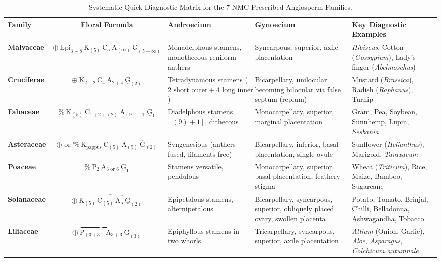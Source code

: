 \documentclass[10pt,twoside,openright]{book}
\begin{document}
\begin{landscape}
\begin{table}[p]
\centering
\small
\setlength{\tabcolsep}{4pt}
\renewcommand{\arraystretch}{1.2}
\begin{tabularx}{\linewidth}{l c p{3.2cm} p{3.2cm} X}
\toprule
\textbf{Family} & \textbf{Floral Formula} & \textbf{Androecium} & \textbf{Gynoecium} & \textbf{Key Diagnostic Examples} \\
\midrule
\textbf{Malvaceae} & $\oplus\:\text{Epi}_{3-8}\:\text{K}_{(5)}\:\text{C}_5\:\text{A}_{(\infty)}\:\underline{\text{G}}_{(5-\infty)}$ & Monadelphous stamens, monothecous reniform anthers & Syncarpous, superior, axile placentation & \textit{Hibiscus}, Cotton (\textit{Gossypium}), Lady's finger (\textit{Abelmoschus}) \\
\textbf{Cruciferae} & $\oplus\:\text{K}_{2+2}\:\text{C}_{4}\:\text{A}_{2+4}\:\underline{\text{G}}_{(2)}$ & Tetradynamous stamens ($2\text{ short outer} + 4\text{ long inner}$) & Bicarpellary, unilocular becoming bilocular via false septum (replum) & Mustard (\textit{Brassica}), Radish (\textit{Raphanus}), Turnip \\
\textbf{Fabaceae} & $\% \:\text{K}_{(5)}\:\text{C}_{1+2+(2)}\:\text{A}_{(9)+1}\:\underline{\text{G}}_1$ & Diadelphous stamens $[(9)+1]$, dithecous & Monocarpellary, superior, marginal placentation & Gram, Pea, Soybean, Sunnhemp, Lupin, \textit{Sesbania} \\
\textbf{Asteraceae} & $\oplus \text{ or } \%\:\text{K}_{\text{pappus}}\:\text{C}_{(5)}\:\text{A}_{(5)}\:\overline{\text{G}}_{(2)}$ & Syngenesious (anthers fused, filaments free) & Bicarpellary, inferior, basal placentation, single ovule & Sunflower (\textit{Helianthus}), Marigold, \textit{Taraxacum} \\
\textbf{Poaceae} & $\% \:\text{P}_{2}\:\text{A}_{3 \text{ or } 6}\:\underline{\text{G}}_1$ & Stamens versatile, pendulous & Monocarpellary, superior, basal placentation, feathery stigma & Wheat (\textit{Triticum}), Rice, Maize, Bamboo, Sugarcane \\
\textbf{Solanaceae} & $\oplus\:\text{K}_{(5)}\:\overbrace{\text{C}_{(5)}\:\text{A}_5}\:\underline{\text{G}}_{(2)}$ & Epipetalous stamens, alternipetalous & Bicarpellary, syncarpous, superior, obliquely placed ovary, swollen placenta & Potato, Tomato, Brinjal, Chilli, Belladonna, Ashwagandha, Tobacco \\
\textbf{Liliaceae} & $\oplus\:\overbrace{\text{P}_{(3+3)}\:\text{A}_{3+3}}\:\underline{\text{G}}_{(3)}$ & Epiphyllous stamens in two whorls & Tricarpellary, syncarpous, superior, axile placentation & \textit{Allium} (Onion, Garlic), \textit{Aloe}, \textit{Asparagus}, \textit{Colchicum autumnale} \\
\bottomrule
\end{tabularx}
\caption{Systematic Quick-Diagnostic Matrix for the 7 NMC-Prescribed Angiosperm Families.}
\end{table}
\end{landscape}
\end{document}
